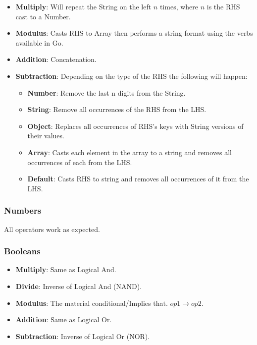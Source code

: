 \documentclass[12pt, letterpaper]{article}
\begin{document}
\begin{itemize}
    \item \textbf{Multiply}: Will repeat the String on the left $n$ times, where $n$ is the RHS cast to a Number.
    \item \textbf{Modulus}: Casts RHS to Array then performs a string format using the verbs available in Go.
    \item \textbf{Addition}: Concatenation.
    \item \textbf{Subtraction}: Depending on the type of the RHS the following will happen:
    \begin{itemize}
        \item \textbf{Number}:  Remove the last n digits from the String.
        \item \textbf{String}:  Remove all occurrences of the RHS from the LHS.
        \item \textbf{Object}:  Replaces all occurrences of RHS's keys with String versions of their values.
        \item \textbf{Array}:   Casts each element in the array to a string and removes all occurrences of each from the LHS.
        \item \textbf{Default}: Casts RHS to string and removes all occurrences of it from the LHS.
    \end{itemize}
\end{itemize}

\subsubsection{Numbers}

All operators work as expected.

\subsubsection{Booleans}

\begin{itemize}
    \item \textbf{Multiply}: Same as Logical And.
    \item \textbf{Divide}: Inverse of Logical And (NAND).
    \item \textbf{Modulus}: The material conditional/Implies that. $op1 \rightarrow op2$.
    \item \textbf{Addition}: Same as Logical Or.
    \item \textbf{Subtraction}: Inverse of Logical Or (NOR).
\end{itemize}
\end{document}
